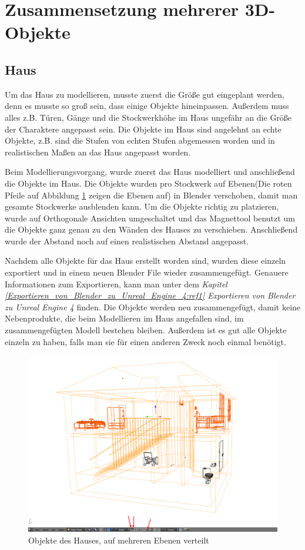 \section{Zusammensetzung mehrerer 3D-Objekte}
\subsection{Haus}
\label{haus:ref1}
Um das Haus zu modellieren, musste zuerst die Größe gut eingeplant werden, denn es musste so groß sein, dass einige Objekte hineinpassen.
Außerdem muss alles z.B. Türen, Gänge und die Stockwerkhöhe im Haus ungefähr an die Größe der Charaktere angepasst sein.
Die Objekte im Haus sind angelehnt an echte Objekte, z.B. sind die Stufen von echten Stufen abgemessen worden und in realistischen Maßen an das Haus angepasst worden.

Beim Modellierungsvorgang, wurde zuerst das Haus modelliert und anschließend die Objekte im Haus. Die Objekte wurden pro Stockwerk auf Ebenen(Die roten Pfeile auf Abbildung \ref{Haus:image1} zeigen
die Ebenen auf) in Blender verschoben, damit man gesamte Stockwerke ausblenden kann. Um die Objekte richtig zu platzieren, wurde auf Orthogonale Ansichten umgeschaltet
und das Magnettool benutzt um die Objekte ganz genau zu den Wänden des Hauses zu verschieben. Anschließend wurde der Abstand noch auf einen realistischen Abstand angepasst.

Nachdem alle Objekte für das Haus erstellt worden sind, wurden diese einzeln exportiert und in einem neuen Blender File wieder zusammengefügt. Genauere Informationen zum Exportieren, kann
man unter dem \textit{Kapitel \ref{Exportieren_von_Blender_zu_Unreal_Engine_4:ref1} \dq Exportieren von Blender zu Unreal Engine 4\dq} finden. Die Objekte werden neu zusammengefügt, damit keine Nebenprodukte, die beim Modellieren
im Haus angefallen sind, im zusammengefügten Modell bestehen bleiben. Außerdem ist es gut alle Objekte einzeln zu haben, falls man sie für einen anderen Zweck noch einmal benötigt.

\begin{figure}[h]
    \centering
    \includegraphics[width=.8\textwidth]{images/Haus-zusammenfuegen_Ebenen.png}
    \caption{Objekte des Hauses, auf mehreren Ebenen verteilt}
    \label{Haus:image1}
\end{figure}